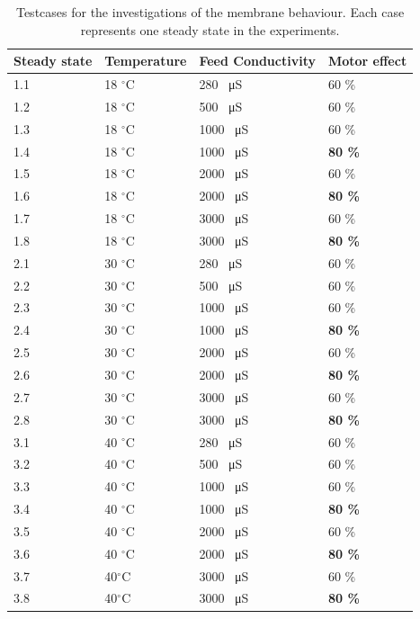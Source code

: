 \begin{table}[h]
\centering
\begin{tabular}{|p{1.4cm}||p{2cm}|p{3.2cm}|p{1.8cm}|}
 \hline
 \textbf{Steady state }&Temperature&Feed Conductivity&Motor effect \\
 \hline
 1.1 & 18 $^\circ$C   & 280 \SI{}{\micro\siemens} & 60 \% \\
 1.2   &  18 $^\circ$C   & 500 \SI{}{\micro\siemens} & 60 \% \\
 1.3 &  18 $^\circ$C  &1000 \SI{}{\micro\siemens} & 60 \% \\
 1.4 &  18 $^\circ$C  &1000 \SI{}{\micro\siemens} & \textbf{80 \%} \\
 1.5 &18 $^\circ$C &2000 \SI{}{\micro\siemens}& 60 \%\\
 1.6 &18 $^\circ$C  &2000 \SI{}{\micro\siemens}& \textbf{80 \%}\\
 1.7   &18 $^\circ$C & 3000 \SI{}{\micro\siemens}&60 \% \\
 1.8   &18 $^\circ$C&3000 \SI{}{\micro\siemens}& \textbf{80 \%}\\
 \hline
 2.1 & 30 $^\circ$C & 280 \SI{}{\micro\siemens}&60 \%\\
 2.2 & 30 $^\circ$C &500 \SI{}{\micro\siemens}& 60 \%\\
 2.3 & 30 $^\circ$C&1000 \SI{}{\micro\siemens}& 60 \%\\
 2.4 & 30 $^\circ$C&1000 \SI{}{\micro\siemens}& \textbf{80 \%}\\
 2.5 & 30 $^\circ$C&2000 \SI{}{\micro\siemens}& 60 \%\\
 2.6 & 30 $^\circ$C&2000 \SI{}{\micro\siemens}& \textbf{80 \%}\\
 2.7 & 30 $^\circ$C& 3000 \SI{}{\micro\siemens}&60 \%\\
 2.8 & 30 $^\circ$C& 3000 \SI{}{\micro\siemens}&\textbf{80 \%}\\
 \hline 
 3.1 & 40 $^\circ$C& 280 \SI{}{\micro\siemens}& 60 \%\\
 3.2 & 40 $^\circ$C &500 \SI{}{\micro\siemens}& 60 \%\\
 3.3 & 40 $^\circ$C  & 1000 \SI{}{\micro\siemens}& 60 \%\\
 3.4 & 40 $^\circ$C  & 1000 \SI{}{\micro\siemens}& \textbf{80 \%}\\
 3.5 & 40 $^\circ$C&2000 \SI{}{\micro\siemens}& 60 \%\\
 3.6 & 40 $^\circ$C &2000 \SI{}{\micro\siemens}& \textbf{80 \%}\\
 3.7 & 40$^\circ$C &3000 \SI{}{\micro\siemens}& 60 \%\\
 3.8 & 40$^\circ$C &3000 \SI{}{\micro\siemens}& \textbf{80 \%}\\
\hline
\end{tabular}
\caption{Testcases for the investigations of the membrane behaviour. Each case represents one steady state in the experiments.}
    \label{tab:test cases} 
\end{table}


